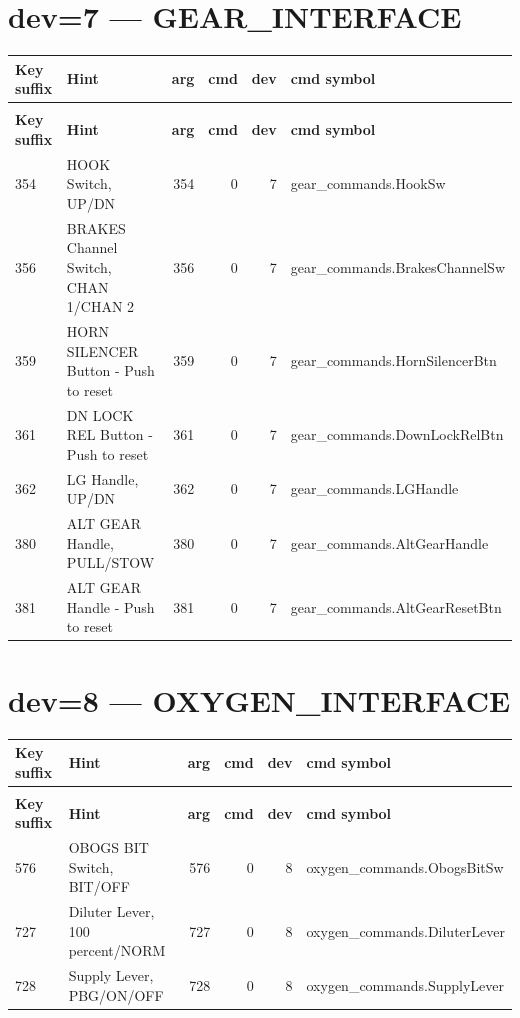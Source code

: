 \documentclass[10pt,a4paper]{article}
\begin{document}
\section{dev=7 — GEAR\_INTERFACE}
\begin{longtable}{>{\ttfamily\small}p{38mm} >{\small}p{72mm} r r r >{\ttfamily\small}p{48mm}}
\toprule
\textbf{Key suffix} & \textbf{Hint} & \textbf{arg} & \textbf{cmd} & \textbf{dev} & \textbf{cmd symbol} \\
\midrule
\endfirsthead
\multicolumn{6}{l}{\small\itshape continued\ldots}\\
\toprule
\textbf{Key suffix} & \textbf{Hint} & \textbf{arg} & \textbf{cmd} & \textbf{dev} & \textbf{cmd symbol} \\
\midrule
\endhead
\bottomrule
\endfoot
\rowcolor{rowodd}
  354 & HOOK Switch, UP/DN & 354 & 0 & 7 & gear\_commands.HookSw \\
  356 & BRAKES Channel Switch, CHAN 1/CHAN 2 & 356 & 0 & 7 & gear\_commands.BrakesChannelSw \\
\rowcolor{rowodd}
  359 & HORN SILENCER Button - Push to reset & 359 & 0 & 7 & gear\_commands.HornSilencerBtn \\
  361 & DN LOCK REL Button - Push to reset & 361 & 0 & 7 & gear\_commands.DownLockRelBtn \\
\rowcolor{rowodd}
  362 & LG Handle, UP/DN & 362 & 0 & 7 & gear\_commands.LGHandle \\
  380 & ALT GEAR Handle, PULL/STOW & 380 & 0 & 7 & gear\_commands.AltGearHandle \\
\rowcolor{rowodd}
  381 & ALT GEAR Handle - Push to reset & 381 & 0 & 7 & gear\_commands.AltGearResetBtn \\
\end{longtable}
\section{dev=8 — OXYGEN\_INTERFACE}
\begin{longtable}{>{\ttfamily\small}p{38mm} >{\small}p{72mm} r r r >{\ttfamily\small}p{48mm}}
\toprule
\textbf{Key suffix} & \textbf{Hint} & \textbf{arg} & \textbf{cmd} & \textbf{dev} & \textbf{cmd symbol} \\
\midrule
\endfirsthead
\multicolumn{6}{l}{\small\itshape continued\ldots}\\
\toprule
\textbf{Key suffix} & \textbf{Hint} & \textbf{arg} & \textbf{cmd} & \textbf{dev} & \textbf{cmd symbol} \\
\midrule
\endhead
\bottomrule
\endfoot
\rowcolor{rowodd}
  576 & OBOGS BIT Switch, BIT/OFF & 576 & 0 & 8 & oxygen\_commands.ObogsBitSw \\
  727 & Diluter Lever, 100 percent/NORM & 727 & 0 & 8 & oxygen\_commands.DiluterLever \\
\rowcolor{rowodd}
  728 & Supply Lever, PBG/ON/OFF & 728 & 0 & 8 & oxygen\_commands.SupplyLever \\
\end{longtable}
\end{document}
